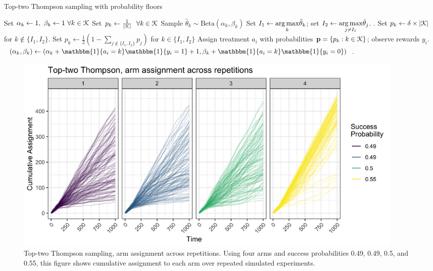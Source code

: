 \documentclass[letterpaper, 12pt, parskip=full,DIV=10]{scrartcl}
\begin{document}
\begin{algorithm} \footnotesize
    \caption{Top-two Thompson sampling with probability floors}
    \label{algg:ttts}
    \begin{algorithmic}[1] %
    	\State Set  $\alpha_{k} \leftarrow 1, \ \beta_{k} \leftarrow 1\ \forall k \in {\EuScript K}$%
			 \State Set $p_{k} \leftarrow \frac{1 }{|{\EuScript K}| } \ \ \forall k \in {\EuScript K} $ 
		\Else 	
				\State Sample $\hat \theta_k  \sim \textrm{Beta}\left(\alpha_{k}, \beta_{k} \right)$ 
			 \EndFor
			\State Set $I_1 \leftarrow \underset{k}{\operatorname*{arg\,max}} \hat\theta_k$; set $I_2 \leftarrow \underset{j\neq I_1}{\operatorname*{arg\,max}} \hat\theta_j$. . 
			\State Set $p_k \leftarrow {\delta \times |{\EuScript K}| } $ for $k \notin \{ I_1, I_2\} $. 
			\State Set $p_k \leftarrow \frac{1}{2} (1-  \sum\limits_{j \notin \{ I_1, I_2\} } p_j) $ for $k \in \{ I_1, I_2\} $ 
		\EndIf
		\State Assign treatment $a_i$ with probabilities $\mathbf{p} = \{ p_k: k \in {\EuScript K} \} $; observe rewards $y_i$.
		 
			\State $(\alpha_{k}, \beta_{k}) \leftarrow (\alpha_{k} + \mathbbm{1}\{ a_i = k\}\mathbbm{1}\{ y_i = 1\} + 1,  \beta_{k} + \mathbbm{1} \{ a_i = k\}\mathbbm{1}\{ y_i = 0\})$. 
		\EndFor	
	\EndFor
    \end{algorithmic}
\end{algorithm}

\begin{figure}[htbp]
   \centering
   \includegraphics[width = 0.95\textwidth]{../../tables-figures/tt_cumulative4.png}
   \caption{Top-two Thompson sampling, arm assignment across repetitions. Using four arms and success probabilities 0.49, 0.49, 0.5, and 0.55, this figure shows cumulative assignment to each arm over repeated simulated experiments. }
   \label{fig:ttt_cumulative}
\end{figure}
\end{document}
